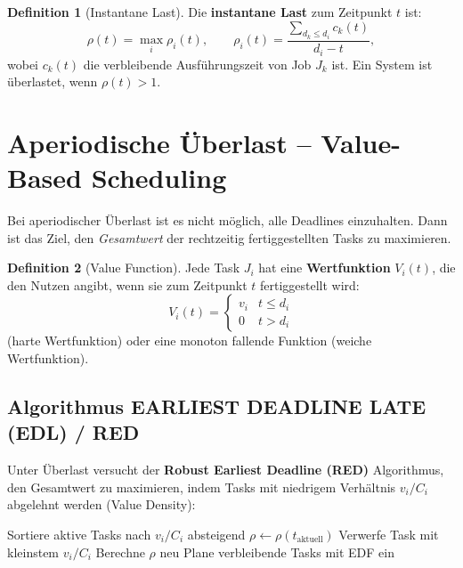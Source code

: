 ﻿\documentclass[a4paper,12pt]{report}
\theoremstyle{definition}
\newtheorem{definition}{Definition}[chapter]
\begin{document}
\begin{definition}[Instantane Last]
	Die \textbf{instantane Last} zum Zeitpunkt $t$ ist:
	\[
		\rho(t) = \max_i \rho_i(t), \qquad
		\rho_i(t) = \frac{\sum_{d_k \leq d_i} c_k(t)}{d_i - t},
	\]
	wobei $c_k(t)$ die verbleibende Ausführungszeit von Job $J_k$ ist.
	Ein System ist überlastet, wenn $\rho(t) > 1$.
\end{definition}

\section{Aperiodische Überlast -- Value-Based Scheduling}

Bei aperiodischer Überlast ist es nicht möglich, alle Deadlines einzuhalten.
Dann ist das Ziel, den \emph{Gesamtwert} der rechtzeitig fertiggestellten Tasks
zu maximieren.

\begin{definition}[Value Function]
	Jede Task $J_i$ hat eine \textbf{Wertfunktion} $V_i(t)$, die den Nutzen angibt,
	wenn sie zum Zeitpunkt $t$ fertiggestellt wird:
	\[
		V_i(t) = \begin{cases} v_i & t \leq d_i \\ 0 & t > d_i \end{cases}
	\]
	(harte Wertfunktion) oder eine monoton fallende Funktion (weiche Wertfunktion).
\end{definition}

\subsection{Algorithmus EARLIEST DEADLINE LATE (EDL) / RED}

Unter Überlast versucht der \textbf{Robust Earliest Deadline (RED)} Algorithmus,
den Gesamtwert zu maximieren, indem Tasks mit niedrigem Verhältnis $v_i/C_i$
abgelehnt werden (Value Density):

\begin{algorithm}[H]
	\caption{Value-Based Scheduling unter Überlast (vereinfacht)}
	\begin{algorithmic}[1]
		\State Sortiere aktive Tasks nach $v_i/C_i$ absteigend
		\State $\rho \leftarrow \rho(t_{\text{aktuell}})$
		\State Verwerfe Task mit kleinstem $v_i/C_i$
		\State Berechne $\rho$ neu
		\EndWhile
		\State Plane verbleibende Tasks mit EDF ein
	\end{algorithmic}
\end{algorithm}
\end{document}
